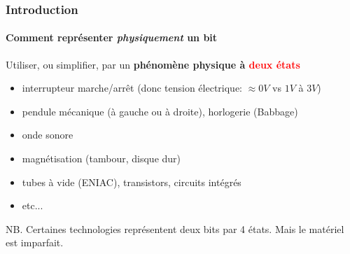 \documentclass[xcolor=svgnames,final,smaller,a4]{beamer}
\begin{document}
\begin{frame}
  \frametitle{Introduction}
  \framesubtitle{Comment représenter \emph{physiquement} un bit}

  Utiliser, ou simplifier, par un \textbf{phénomène physique à \textcolor{red}{deux états}}

  \begin{itemize}
  \item interrupteur marche/arrêt (donc tension électrique: $\approx 0V$ vs $1V$ à $3V$)
  \item pendule mécanique (à gauche ou à droite), horlogerie (Babbage)
    \item onde sonore
    \item magnétisation (tambour, disque dur)
  \item tubes à vide (ENIAC), transistors, circuits intégrés
  \item etc...
  \end{itemize}
  
  \vspace{2mm}
 
  NB. Certaines technologies {} représentent deux bits par 4 états. 
  Mais le matériel est imparfait.
\end{frame}
\end{document}
